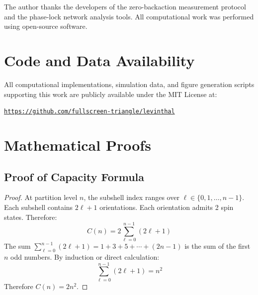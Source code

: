 \documentclass[aps,prx,superscriptaddress,twocolumn,10pt,a4paper,longbibliography,preprint]{revtex4-2}
\theoremstyle{definition}
\theoremstyle{remark}
\begin{document}
\begin{acknowledgments}
The author thanks the developers of the zero-backaction measurement protocol and the phase-lock network analysis tools. All computational work was performed using open-source software.
\end{acknowledgments}

\section*{Code and Data Availability}
\label{sec:code}

All computational implementations, simulation data, and figure generation scripts supporting this work are publicly available under the MIT License at:

\begin{center}
\Large
\href{https://github.com/fullscreen-triangle/levinthal}{\texttt{https://github.com/fullscreen-triangle/levinthal}}
\end{center}


\appendix

\section{Mathematical Proofs}
\label{app:proofs}

\subsection{Proof of Capacity Formula}

\begin{proof}
At partition level $n$, the subshell index ranges over $\ell \in \{0, 1, \ldots, n-1\}$. Each subshell contains $2\ell + 1$ orientations. Each orientation admits 2 spin states. Therefore:
\begin{equation}
C(n) = 2 \sum_{\ell=0}^{n-1} (2\ell + 1)
\end{equation}
The sum $\sum_{\ell=0}^{n-1}(2\ell + 1) = 1 + 3 + 5 + \cdots + (2n-1)$ is the sum of the first $n$ odd numbers. By induction or direct calculation:
\begin{equation}
\sum_{\ell=0}^{n-1}(2\ell + 1) = n^2
\end{equation}
Therefore $C(n) = 2n^2$.
\end{proof}
\end{document}
